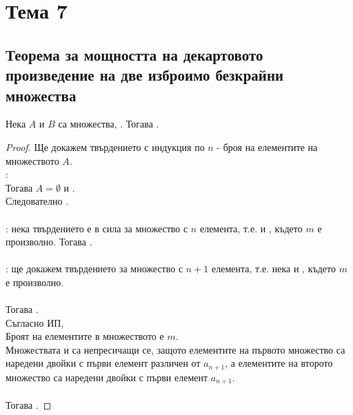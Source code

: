 \section{Тема 7}

\subsection{Теорема за мощността на декартовото произведение на две изброимо безкрайни множества}
\begin{theorem}
    Нека \(A\) и \(B\) са множества, . Тогава .    
\end{theorem}
\begin{proof}
    Ще докажем твърдението с индукция по \(n\) - броя на елементите на множеството \(A\). \\
    :  \\
    Тогава \(A = \emptyset\) и . \\
    Следователно . \\ \\
    : нека твърдението е в сила за множество с \(n\) елемента, т.е.
     и , където \(m\) е произволно. Тогава
    . \\ \\
    : ще докажем твърдението за множество с \(n + 1\) елемента, т.е. нека 
     и , където \(m\) е произволно. \\ \\
    Тогава . \\
    Съгласно ИП,  \\
    Броят на елементите в множеството  е \(m\). \\
    Множествата  и  са непресичащи се, защото елементите на първото множество са наредени 
    двойки с първи елемент различен от \(a_{n + 1}\), а елементите на второто множество са наредени 
    двойки с първи елемент \(a_{n + 1}\). \\ \\
    Тогава .
\end{proof}

